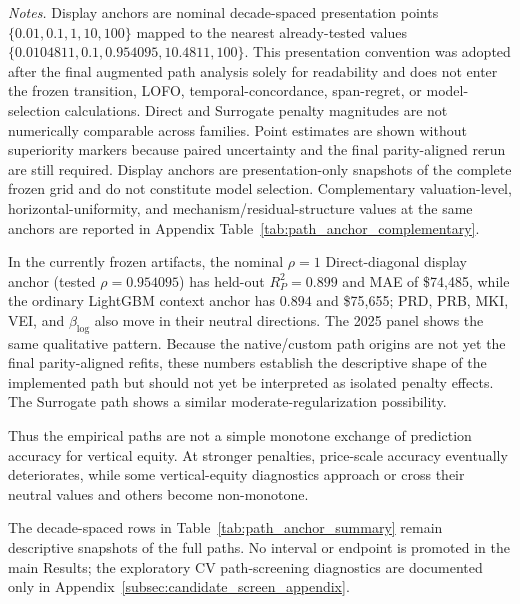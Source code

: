 \documentclass[10pt]{article}
\theoremstyle{definition}
\newcommand{\1}{\mathbf{1}}
\begin{document}
{\begin{table}[!htbp]
\begin{minipage}{\textwidth}
\emph{Notes.}
Display anchors are nominal decade-spaced presentation points $\{0.01,0.1,1,10,100\}$ mapped to the nearest already-tested values $\{0.0104811,0.1,0.954095,10.4811,100\}$. This presentation convention was adopted after the final augmented path analysis solely for readability and does not enter the frozen transition, LOFO, temporal-concordance, span-regret, or model-selection calculations. Direct and Surrogate penalty magnitudes are not numerically comparable across families.
Point estimates are shown without superiority markers because paired uncertainty and the final parity-aligned rerun are still required. Display anchors are presentation-only snapshots of the complete frozen grid and do not constitute model selection. Complementary valuation-level, horizontal-uniformity, and mechanism/residual-structure values at the same anchors are reported in Appendix Table~\ref{tab:path_anchor_complementary}.
\end{minipage}
\end{table}

}


In the currently frozen artifacts, the nominal $\rho=1$ Direct-diagonal display anchor (tested $\rho=0.954095$) has held-out $R^2_P=0.899$ and MAE of \$74,485, while the ordinary LightGBM context anchor has $0.894$ and \$75,655; PRD, PRB, MKI, VEI, and $\beta_{\log}$ also move in their neutral directions. The 2025 panel shows the same qualitative pattern. Because the native/custom path origins are not yet the final parity-aligned refits, these numbers establish the descriptive shape of the implemented path but should not yet be interpreted as isolated penalty effects. The Surrogate path shows a similar moderate-regularization possibility.

Thus the empirical paths are not a simple monotone exchange of prediction accuracy for vertical equity. At stronger penalties, price-scale accuracy eventually deteriorates, while some vertical-equity diagnostics approach or cross their neutral values and others become non-monotone.


The decade-spaced rows in Table~\ref{tab:path_anchor_summary} remain descriptive snapshots of the full paths. No interval or endpoint is promoted in the main Results; the exploratory CV path-screening diagnostics are documented only in Appendix~\ref{subsec:candidate_screen_appendix}.
\end{document}
